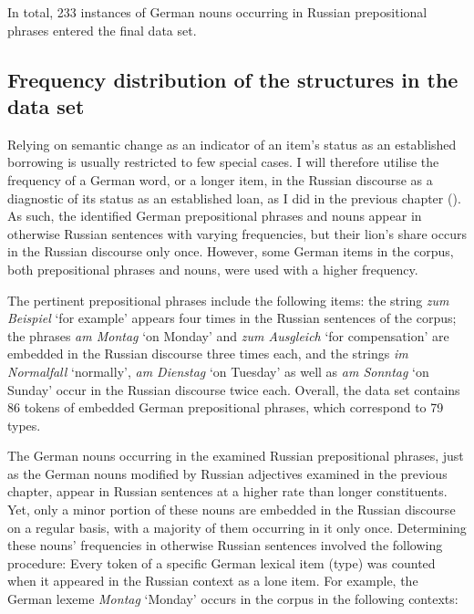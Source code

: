 In total, 233 instances of German nouns occurring in Russian prepositional phrases entered the final data set.

\subsection{Frequency distribution of the structures in the data set}

\noindent Relying on semantic change as an indicator of an item's status as an established borrowing is usually restricted to few special cases. I will therefore utilise the frequency of a German word, or a longer item, in the Russian discourse as a diagnostic of its status as an established loan, as I did in the previous chapter (). As such, the identified German prepositional phrases and nouns appear in otherwise Russian sentences with varying frequencies, but their lion's share occurs in the Russian discourse only once. However, some German items in the corpus, both prepositional phrases and nouns, were used with a higher frequency.

The pertinent prepositional phrases include the following items: the string \textit{zum Beispiel} `for example' appears four times in the Russian sentences of the corpus; the phrases \textit{am Montag} `on Monday' and \textit{zum Ausgleich} `for compensation' are embedded in the Russian discourse three times each, and the strings \textit{im Normalfall} `normally', \textit{am Dienstag} `on Tuesday' as well as \textit{am Sonntag} `on Sunday' occur in the Russian discourse twice each. Overall, the data set contains 86 tokens of embedded German prepositional phrases, which correspond to 79 types.

The German nouns occurring in the examined Russian prepositional phrases, just as the German nouns modified by Russian adjectives examined in the previous chapter, appear in Russian sentences at a higher rate than longer constituents. Yet, only a minor portion of these nouns are embedded in the Russian discourse on a regular basis, with a majority of them occurring in it only once. Determining these nouns’ frequencies in otherwise Russian sentences involved the following procedure: Every token of a specific German lexical item (type) was counted when it appeared in the Russian context as a lone item. For example, the German lexeme \textit{Montag} `Monday' occurs in the corpus in the following contexts:

